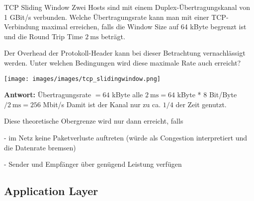 \begin{example2}{TCP Sliding Window}
Zwei Hosts sind mit einem Duplex-Übertragungskanal von 1 GBit/s verbunden. Welche Übertragungsrate kann man mit einer TCP-Verbindung maximal erreichen, falls die Window Size auf 64 kByte begrenzt ist und die Round Trip Time $2 \mathrm{~ms}$ beträgt.

Der Overhead der Protokoll-Header kann bei dieser Betrachtung vernachlässigt werden. Unter welchen Bedingungen wird diese maximale Rate auch erreicht?

\begin{minipage}{0.4\linewidth}
  \texttt{[image: images/images/tcp\_slidingwindow.png]}
\end{minipage}
\begin{minipage}{0.6\linewidth}
  \textbf{Antwort:}
Übertragungsrate $=64$ kByte alle $2 \mathrm{~ms}=64$ kByte * 8 Bit/Byte $/ 2 \mathrm{~ms}=256$ Mbit/s Damit ist der Kanal nur zu ca. $1 / 4$ der Zeit genutzt.
\end{minipage}

Diese theoretische Obergrenze wird nur dann erreicht, falls

- im Netz keine Paketverluste auftreten (würde als Congestion interpretiert und die Datenrate bremsen)

- Sender und Empfänger über genügend Leistung verfügen
  
\end{example2}

\subsection*{Application Layer}

